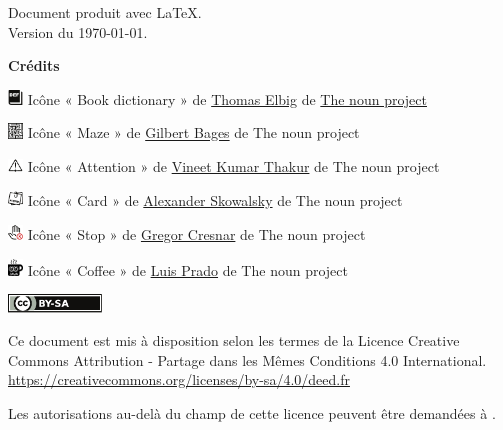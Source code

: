 
\thispagestyle{empty}

\vfill

\bigskip
\noindent
Document produit avec \LaTeX.
\\Version du \today.

\vfill

\textbf{Crédits}

\includegraphics[width=4mm]{icon/definition}
Icône « Book dictionary » de 
\href{https://thenounproject.com/dergraph}{Thomas Elbig} de 
\href{https://thenounproject.com}{The noun project}

\includegraphics[width=4mm]{icon/reflexion}
Icône « Maze » de 
\href{https://thenounproject.com/gilbertbages}{Gilbert Bages} de 
The noun project

\includegraphics[width=4mm]{icon/attention}
Icône « Attention » de 
\href{https://thenounproject.com/vkvineet}{Vineet Kumar Thakur} de
The noun project

\includegraphics[width=4mm]{icon/fiche}
Icône « Card » de 
\href{https://thenounproject.com/sandorsz}{Alexander Skowalsky} de
The noun project

\includegraphics[width=4mm]{icon/dont}
Icône « Stop » de 
\href{https://thenounproject.com/grega.cresnar}{Gregor Cresnar} de
The noun project

\includegraphics[width=4mm]{icon/java}
Icône « Coffee » de 
\href{https://thenounproject.com/Luis}{Luis Prado} de
The noun project




\vspace{1cm}
\includegraphics[width=25mm]{images/cc-by-sa}

Ce document est mis à disposition selon les termes de la Licence Creative
\\Commons Attribution - Partage dans les Mêmes Conditions 4.0 International.
\\\url{https://creativecommons.org/licenses/by-sa/4.0/deed.fr}

Les autorisations au-delà du champ de cette licence
peuvent être demandées à \texttt{\contact}.

